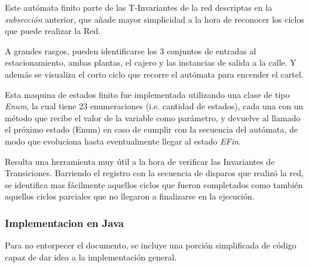 \documentclass[12pt,a4paper]{article}
\begin{document}
Este autómata finito parte de las T-Invariantes de la red descriptas en la \textit{subsección} anterior, que añade mayor simplicidad a la hora de reconocer los ciclos que puede realizar la Red.

A grandes rasgos, pueden identificarse los 3 conjuntos de entradas al estacionamiento, ambas plantas, el cajero y las instancias de salida a la calle. Y además se visualiza el corto ciclo que recorre el autómata para encender el cartel.

Esta maquina de estados finito fue implementada utilizando una clase de tipo \textit{Enum}, la cual tiene 23 enumeraciones (i.e. cantidad de estados), cada una con un método que recibe el valor de la variable como parámetro, y devuelve al llamado el próximo estado (Enum) en caso de cumplir con la secuencia del autómata, de modo que evoluciona hasta eventualmente llegar al estado \textit{EFin}.

Resulta una herramienta muy útil a la hora de verificar las Invariantes de Transiciones. Barriendo el registro con la secuencia de disparos que realizó la red, se identifica mas fácilmente aquellos ciclos que fueron completados como también aquellos ciclos parciales que no llegaron a finalizarse en la ejecución.

\subsubsection*{Implementacion en Java}
Para no entorpecer el documento, se incluye una porción simplificada de código capaz de dar idea a la implementación general.
\end{document}
